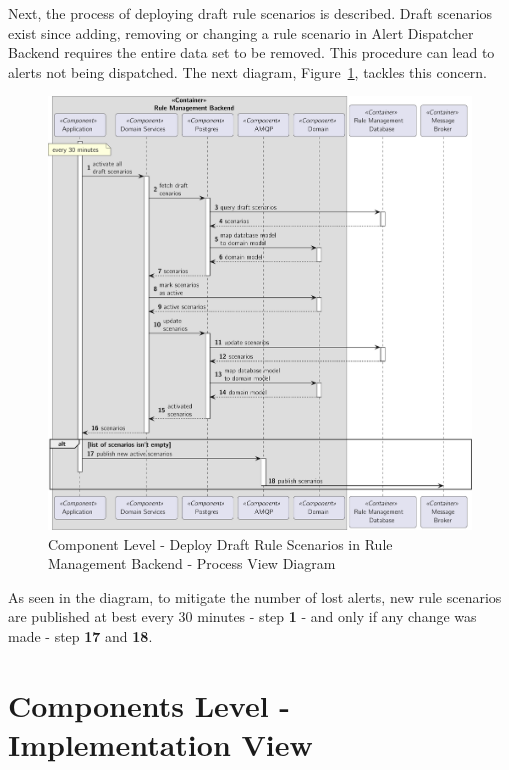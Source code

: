Next, the process of deploying draft rule scenarios is described.
Draft scenarios exist since adding, removing or changing a rule scenario in Alert Dispatcher Backend requires the entire data set to be removed. This procedure can lead to alerts not being dispatched. The next diagram, Figure~\ref{fig:design:architecture:platform:component:process:diagram:rule}, tackles this concern.

\begin{figure}[H]
   \centering
   \includegraphics[page=1,width=\columnwidth]{assets/diagrams/design/architectural/level3/process/rule-management-backend.pdf}
   \caption[Component Level - Deploy Draft Rule Scenarios in Rule Management Backend - Process View Diagram]{Component Level - Deploy Draft Rule Scenarios in Rule Management Backend - Process View Diagram}
   \label{fig:design:architecture:platform:component:process:diagram:rule}
\end{figure}

As seen in the diagram, to mitigate the number of lost alerts, new rule scenarios are published at best every 30 minutes - step \textbf{1} - and only if any change was made - step \textbf{17} and \textbf{18}.

\section{Components Level - Implementation View}
\label{par:design:architecture:platform:components:development}


